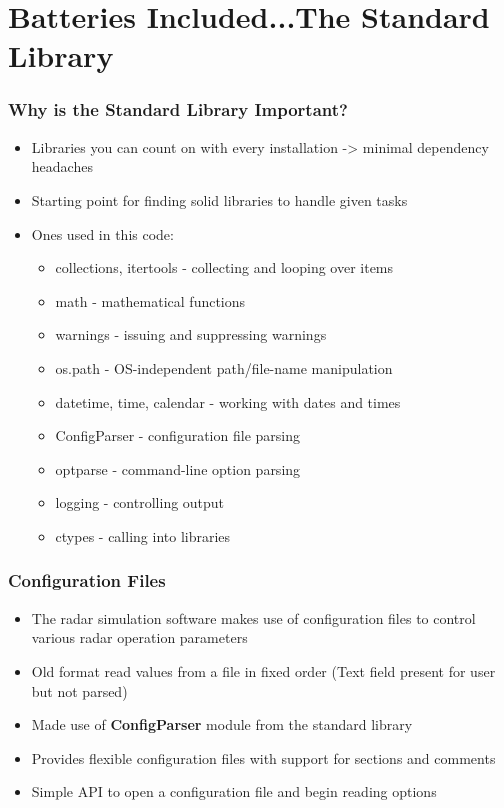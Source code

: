 \documentclass[red, hyperref={pdfpagelabels=false}]{beamer}
\begin{document}
\section[The Standard Library]{Batteries Included...The Standard Library}
\begin{frame}
  \frametitle{Why is the Standard Library Important?}
  \begin{itemize}
    \item<1-> Libraries you can count on with every installation -> minimal dependency headaches
    \item<2-> Starting point for finding solid libraries to handle given tasks
    \item<3-> Ones used in this code:
      \begin{itemize}
        \item collections, itertools - collecting and looping over items
        \item math - mathematical functions
        \item warnings - issuing and suppressing warnings
        \item os.path - OS-independent path/file-name manipulation
        \item datetime, time, calendar - working with dates and times
        \item \alert<4->{ConfigParser} - configuration file parsing
        \item \alert<4->{optparse} - command-line option parsing
        \item \alert<4->{logging} - controlling output
        \item \alert<4->{ctypes} - calling into libraries
      \end{itemize}
  \end{itemize}
\end{frame}

\begin{frame}
  \frametitle{Configuration Files}
  \begin{itemize}
    \item The radar simulation software makes use of configuration files to
      control various radar operation parameters
    \item Old format read values from a file in fixed order (Text field present for user but not parsed)
    \item Made use of \textbf{ConfigParser} module from the standard library
    \item Provides flexible configuration files with support for sections and comments
    \item Simple API to open a configuration file and begin reading options
  \end{itemize}
\end{frame}
\end{document}
